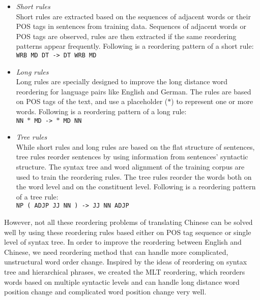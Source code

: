 \documentclass[a4paper]{article}
\begin{document}
\begin{itemize}
\item \emph{Short rules} \cite{short} \\
Short rules are extracted based on the sequences of adjacent words or their POS tags in sentences from training data. Sequences of adjacent words or POS tags are observed, rules are then extracted if the same reordering patterns appear frequently. Following is a reordering pattern of a short rule:\medskip\\
\texttt{WRB MD DT -> DT WRB MD}
\item \emph{Long rules} \cite{long}\\
Long rules are specially designed to improve the long distance word reordering for language pairs like English and German. The rules are based on POS tags of the text, and use a placeholder ($*$) to represent one or more words. Following is a reordering pattern of a long rule:\medskip\\
\texttt{NN $*$ MD -> $*$ MD NN}

\item \emph{Tree rules} \cite{tree}\\
While short rules and long rules are based on the flat structure of sentences, tree rules reorder sentences by using information from sentences' syntactic structure. The syntax tree and word alignment of the training corpus are used to train the reordering rules. The tree rules reorder the words both on the word level and on the constituent level. Following is a reordering pattern of a tree rule:\medskip\\
\texttt{NP ( ADJP JJ NN ) -> JJ NN ADJP}%
\end{itemize}

However, not all these reordering problems of translating Chinese can be solved well by using these reordering rules based either on POS tag sequence or single level of syntax tree. In order to improve the reordering between English and Chinese, we need reordering method that can handle more complicated, unstructural word order change. Inspired by the ideas of reordering on syntax tree and hierarchical phrases, we created the MLT reordering, which reorders words based on multiple syntactic levels and can handle long distance word position change and complicated word position change very well.
\end{document}
